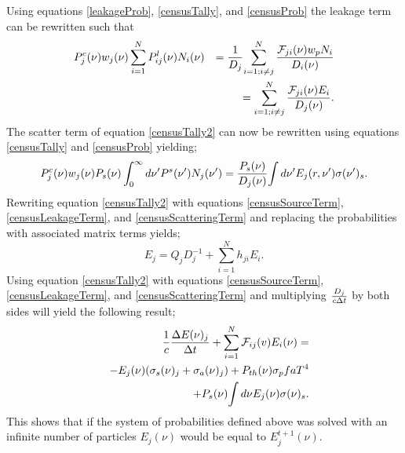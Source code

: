 	Using equations \ref{leakageProb}, \ref{censusTally}, and \ref{censusProb} the leakage term can be rewritten such that
	\begin{eqnarray}
	\label{censusLeakageTerm}
	P^c_j(\nu)w_j(\nu)\sum_{i=1}^N{P^l_{ij}(\nu)}N_i(\nu)& &={1\over{D_j}}{\sum_{i=1;i\neq{j}}^N{\mathcal{F}_{ji}(\nu)w_pN_i\over{D_i(\nu)}}} \\& & \nonumber
	={\sum_{i=1;i\neq{j}}^N{\mathcal{F}_{ji}(\nu)E_i\over{D_j(\nu)}}}.
	\end{eqnarray}
	The scatter term of equation \ref{censusTally2} can now be rewritten using equations \ref{censusTally} and \ref{censusProb} yielding;
	\begin{equation}
	\label{censusScatteringTerm}
	P^c_j(\nu)w_j(\nu)P_s(\nu)\int^\infty_0d\nu' P^s(\nu')N_j(\nu')={P_s(\nu)\over{D_j(\nu)}}{\int{d\nu'}E_j(r,\nu')\sigma(\nu')_s}.
	\end{equation}
	Rewriting equation \ref{censusTally2} with equations \ref{censusSourceTerm}, \ref{censusLeakageTerm}, and \ref{censusScatteringTerm} and replacing the probabilities with associated matrix terms yields;
	\begin{equation}
	\label{censusTallyFinal}
	E_j=Q_jD_j^{-1}+\sum_{i=1}^N{h_{ji}E_i}.
	\end{equation}
	Using equation \ref{censusTally2} with equations \ref{censusSourceTerm}, \ref{censusLeakageTerm}, and \ref{censusScatteringTerm} and multiplying $D_j\over{c\Delta{t}}$ by both sides will yield the following result;
	\begin{eqnarray}
	\label{ProbabilitiesDiffusion}
	& &{1\over{c}}{\Delta{E(\nu)_j}\over{\Delta{t}}} + \sum_{i=1}^N\mathcal{F}_{ij}(v)E_i(\nu)=\nonumber \\& & -E_j(\nu)(\sigma_s(\nu)_j+\sigma_a(\nu)_j)+P_{th}(\nu)\sigma_pfaT^4\nonumber \\& & +P_s({\nu}){\int{d\nu}E_j(\nu)\sigma(\nu)_s}.
	\end{eqnarray}
	This shows that if the system of probabilities defined above was solved with an infinite number of particles $E_j(\nu)$ would be equal to $E^{t+1}_j(\nu)$.


